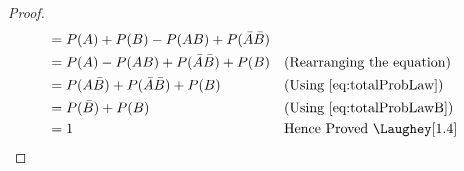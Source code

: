 \begin{enumerate}[a.]
\begin{proof}
\begin{align}
					&= P(A) + P(B) - P(AB) + P(\bar{A}\bar{B}) \nonumber\\
					&= P(A) - P(AB) + P(\bar{A}\bar{B}) + P(B)&& \text{(Rearranging the equation)}\nonumber\\
					&= P(A\bar{B}) + P(\bar{A}\bar{B}) + P(B) &&\text{(Using \cref{eq:totalProbLaw})} \nonumber\\
					&= P(\bar{B}) + P(B) &&\text{(Using \cref{eq:totalProbLawB})} \nonumber\\
					&= 1 &&\text{Hence Proved \Laughey[1.4]}\nonumber
				\end{align}
			\end{proof}	
%	
%			
%				
%			
%		
			
\end{enumerate}